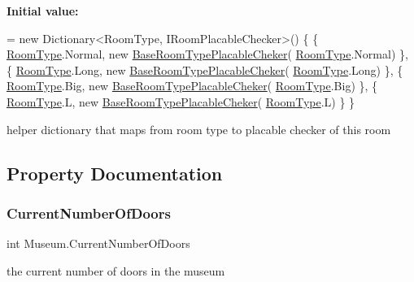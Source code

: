 {\bfseries Initial value\+:}
\begin{DoxyCode}
= \textcolor{keyword}{new} Dictionary<RoomType, IRoomPlacableChecker>()
    \{
            \{ \mbox{\hyperlink{_room_8cs_ab540f7414f306325d92272bcef1e34e1}{RoomType}}.Normal, \textcolor{keyword}{new} \mbox{\hyperlink{class_base_room_type_placable_cheker}{BaseRoomTypePlacableCheker}}(
      \mbox{\hyperlink{_room_8cs_ab540f7414f306325d92272bcef1e34e1}{RoomType}}.Normal) \},
            \{ \mbox{\hyperlink{_room_8cs_ab540f7414f306325d92272bcef1e34e1}{RoomType}}.Long, \textcolor{keyword}{new} \mbox{\hyperlink{class_base_room_type_placable_cheker}{BaseRoomTypePlacableCheker}}(
      \mbox{\hyperlink{_room_8cs_ab540f7414f306325d92272bcef1e34e1}{RoomType}}.Long) \},
            \{ \mbox{\hyperlink{_room_8cs_ab540f7414f306325d92272bcef1e34e1}{RoomType}}.Big, \textcolor{keyword}{new} \mbox{\hyperlink{class_base_room_type_placable_cheker}{BaseRoomTypePlacableCheker}}(
      \mbox{\hyperlink{_room_8cs_ab540f7414f306325d92272bcef1e34e1}{RoomType}}.Big) \},
            \{ \mbox{\hyperlink{_room_8cs_ab540f7414f306325d92272bcef1e34e1}{RoomType}}.L, \textcolor{keyword}{new} \mbox{\hyperlink{class_base_room_type_placable_cheker}{BaseRoomTypePlacableCheker}}(
      \mbox{\hyperlink{_room_8cs_ab540f7414f306325d92272bcef1e34e1}{RoomType}}.L) \}
    \}
\end{DoxyCode}


helper dictionary that maps from room type to placable checker of this room 



\subsection{Property Documentation}
\mbox{\label{class_museum_ab814feb2d391ec372dfc3a6c6c61c51f}} 
\subsubsection{\texorpdfstring{Current\+Number\+Of\+Doors}{CurrentNumberOfDoors}}
{\footnotesize\ttfamily int Museum.\+Current\+Number\+Of\+Doors\hspace{0.3cm}{\ttfamily [get]}}



the current number of doors in the museum 

